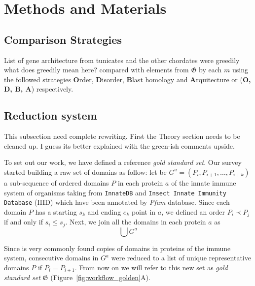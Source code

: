 \documentclass[11pt]{article}
\newcommand{\TODO}[1]{\begingroup\color{red}#1\endgroup}
\newcommand{\CAVH}[1]{\begingroup\color{green}#1\endgroup}
\begin{document}
\section*{Methods and Materials}

\subsection*{Comparison Strategies}\label{comparison}

List of gene architecture from tunicates and the other chordates were
greedily \TODO{what does greedily mean here?} compared with elements from
$\boldsymbol{\mathfrak{G}}$ by each $m$ using the followed strategies
\textbf{O}rder, \textbf{D}isorder, \textbf{B}last homology and
\textbf{A}rquitecture or (\textbf{O, D, B, A}) respectively.

\subsection*{Reduction system}\label{reduction}

\TODO{This subsection need complete rewriting. First the Theory section
  needs to be cleaned up.} 
\CAVH{I guess its better explained with the green-ish comments upside.}

To set out our work, we have defined a reference \textsl{gold standard set}. 
Our survey started building a raw set of domains as follow: let be $G^{a} = 
(P_i,P_{i+1},\ldots,P_{i+k})$ a sub-sequence of ordered domains $P$ in each 
protein $a$ of the innate immune system of organisms taking from 
\texttt{InnateDB} and \texttt{Insect Innate Immunity Database} (IIID) which have 
been annotated by \textit{Pfam} database. Since each domain $P$ has a starting 
$s_k$ and ending $e_k$ point in $a$, we defined an order $P_i \prec P_j$ if and 
only if $s_i \le s_j$. Next, we join all the domains in each protein $a$ as 
\[\bigcup G^{a}\]

Since is very commonly found copies of domains in proteins of the immune 
system, consecutive domains in $G^{a}$ were reduced to a list of unique 
representative domains $P$ if $P_i = P_{i+1}$. From now on we will refer to this 
new set as \textsl{gold standard set} $\boldsymbol{\mathfrak{G}}$ 
(Figure~\ref{fig:workflow_golden}A).
  
\end{document}
